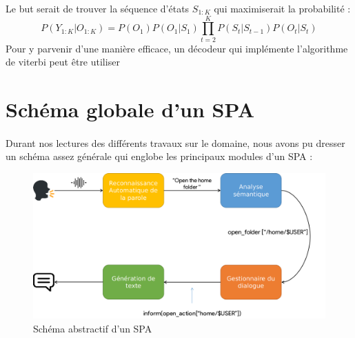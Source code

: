 	\par
	\newpage
	Le but serait de trouver la séquence d'états $S_{1:K}$ qui maximiserait la probabilité \cite{hmm_intro} : 
	\begin{equation}
		P(Y_{1:K} | O_{1:K}) = P(O_1)P(O_1|S_1)\prod_{t=2}^{K}P(S_t|S_{t-1})P(O_t|S_t) 
	\end{equation}
	Pour y parvenir d'une manière efficace, un décodeur qui implémente l'algorithme de viterbi peut être utiliser \cite{viterbi,viterbi_hmm}
\section{Schéma globale d'un SPA}
	\paragraph{}
	Durant nos lectures des différents travaux sur le domaine, nous avons pu dresser un schéma assez générale qui englobe les principaux modules d'un SPA : 
	\begin{figure}[H]
		\centering
		\includegraphics[width=0.75\linewidth]{images/SPA_diagram_2.png}
		\caption{Schéma abstractif d'un SPA \cite{spa_arch}}
		\label{spa_diagram}
	\end{figure}
